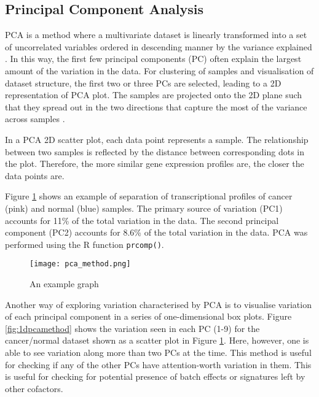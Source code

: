     \subsection{Principal Component Analysis}
    
    PCA is a method where a multivariate dataset is linearly transformed into a set of uncorrelated variables ordered in descending manner by the variance explained \cite{jolliffe2002principal}. In this way, the first few principal components (PC) often explain the largest amount of the variation in the data. For clustering of samples and visualisation of dataset structure, the first two or three PCs are selected, leading to a 2D representation of PCA plot. The samples are projected onto the 2D plane such that they spread out in the two directions that capture the most of the variance across samples \cite{Love2016RNA-SeqApproved}.
    
    In a PCA 2D scatter plot, each data point represents a sample. The relationship between two samples is reflected by the distance between corresponding dots in the plot. Therefore, the more similar gene expression profiles are, the closer the data points are.    
   
    Figure \ref{fig:pcamethod} shows an example of separation of transcriptional profiles of cancer (pink) and normal (blue) samples. The primary source of variation (PC1) accounts for 11\% of the total variation in the data. The second principal component (PC2) accounts for 8.6\% of the total variation in the data. PCA was performed using the R function \texttt{prcomp()}.
    
            \begin{figure}[h]
            \centering
            \texttt{[image: pca\_method.png]}
            \caption{An example graph}
            \label{fig:pcamethod}
            \end{figure}
        
    
    Another way of exploring variation characterised by PCA is to visualise variation of each principal component in a series of one-dimensional box plots. Figure \ref{fig:1dpcamethod} shows the variation seen in each PC (1-9) for the cancer/normal dataset shown as a scatter plot in Figure \ref{fig:pcamethod}. Here, however, one is able to see variation along more than two PCs at the time. This method is useful for checking if any of the other PCs have attention-worth variation in them. This is useful for checking for potential presence of batch effects or signatures left by other cofactors. 
    
